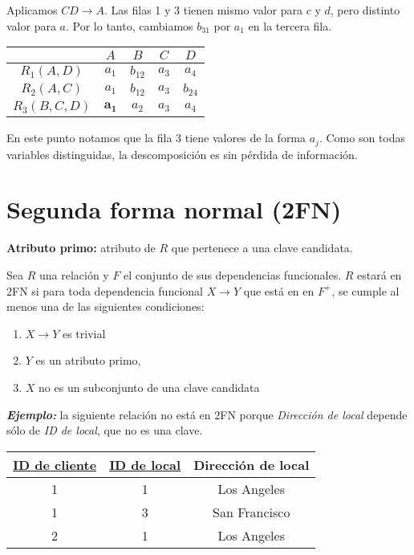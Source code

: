 \documentclass[a4paper, twoside]{article}
\begin{document}
Aplicamos $CD\to A$. Las filas 1 y 3 tienen mismo valor para $c$ y $d$, pero distinto valor para $a$. Por lo tanto, cambiamos $b_{31}$ por $a_{1}$ en la tercera fila.

\begin{center}
	\begin{tabular}{|c|c|c|c|c|}
		\hline 
		 & $A$ & $B$ & $C$ & $D$\\
		\hline 
		\hline 
		$R_{1}(A,D)$ & $a_{1}$ & $b_{12}$ & $a_{3}$ & $a_{4}$\\
		\hline 
		$R_{2}(A,C)$ & $a_{1}$ & $b_{12}$ & $a_{3}$ & $b_{24}$\\
		\hline 
		$R_{3}(B,C,D)$ & $\mathbf{a_{1}}$ & $a_{2}$ & $a_{3}$ & \textbf{$a_{4}$}\\
		\hline 
	\end{tabular}
\end{center}

En este punto notamos que la fila 3 tiene valores de la forma $a_{j}$. Como son todas variables distinguidas, la descomposición es sin pérdida de información.

\section{Segunda forma normal (2FN)}
\textbf{Atributo primo:} atributo de $R$ que pertenece a una clave candidata.

Sea $R$ una relación y $F$ el conjunto de sus dependencias funcionales. $R$ estará en 2FN si para toda dependencia funcional $X\to Y$ que está en en $F^{+}$, se cumple al menos una de las siguientes condiciones:
\begin{enumerate}
	\item $X\to Y$ es trivial
	\item $Y$ es un atributo primo,
	\item $X$ no es un subconjunto de una clave candidata
\end{enumerate}

\textbf{\emph{Ejemplo:}} la siguiente relación no está en 2FN porque \emph{Dirección de local} depende sólo de \emph{ID de local}, que no es una clave.

\begin{center}
	\begin{tabular}{|c|c|c|}
		\hline 
		\uline{ID de cliente} & \uline{ID de local} & Dirección de local\\
		\hline 
		\hline 
		1 & 1 & Los Angeles\\
		\hline 
		1 & 3 & San Francisco\\
		\hline 
		2 & 1 & Los Angeles\\
		\hline 
	\end{tabular}
\end{center}
\end{document}

